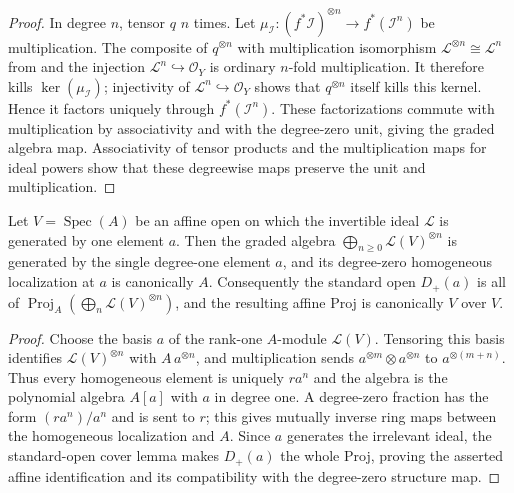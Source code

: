 \begin{proof}
  \leanok
  In degree $n$, tensor $q$ $n$ times.  Let
  $\mu_{\mathcal I}\colon(f^*\mathcal I)^{\otimes n}\to
  f^*(\mathcal I^n)$ be multiplication.  The composite of $q^{\otimes n}$
  with
  multiplication isomorphism
  $\mathcal L^{\otimes n}\cong\mathcal L^n$ from
   and the injection
  $\mathcal L^n\hookrightarrow\mathcal O_Y$ is ordinary $n$-fold
  multiplication.  It therefore kills $\ker(\mu_{\mathcal I})$; injectivity
  of $\mathcal L^n\hookrightarrow\mathcal O_Y$ shows that $q^{\otimes n}$
  itself kills this kernel.  Hence it factors uniquely through
  $f^*(\mathcal I^n)$.  These factorizations commute with multiplication by
  associativity and with the degree-zero unit, giving the graded algebra map.
  Associativity of tensor products and the multiplication maps for ideal
  powers show that these degreewise maps preserve the unit and multiplication.
\end{proof}

\begin{lemma}
  \label{lemma:nagata-relative-proj-invertible-tensor-powers-affine}

  Let $V=\operatorname{Spec}(A)$ be an affine open on which the invertible
  ideal $\mathcal L$ is generated by one element $a$.  Then the graded
  algebra $\bigoplus_{n\geq0}\mathcal L(V)^{\otimes n}$ is generated by the
  single degree-one element $a$, and its degree-zero homogeneous localization
  at $a$ is canonically $A$.  Consequently the standard open $D_+(a)$ is all
  of $\operatorname{Proj}_A(\bigoplus_n\mathcal L(V)^{\otimes n})$, and the
  resulting affine Proj is canonically $V$ over $V$.
\end{lemma}

\begin{proof}
  Choose the basis $a$ of the rank-one $A$-module $\mathcal L(V)$.  Tensoring
  this basis identifies $\mathcal L(V)^{\otimes n}$ with $A\,a^{\otimes n}$,
  and multiplication sends $a^{\otimes m}\otimes a^{\otimes n}$ to
  $a^{\otimes(m+n)}$.  Thus every homogeneous element is uniquely $r a^n$
  and the algebra is the polynomial algebra $A[a]$ with $a$ in degree one.
  A degree-zero fraction has the form $(r a^n)/a^n$ and is sent to $r$;
  this gives mutually inverse ring maps between the homogeneous localization
  and $A$.  Since $a$ generates the irrelevant ideal, the standard-open cover
  lemma makes $D_+(a)$ the whole Proj, proving the asserted affine
  identification and its compatibility with the degree-zero structure map.
\end{proof}

